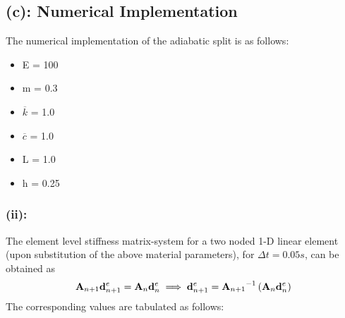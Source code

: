 \subsection*{(c): Numerical Implementation}
The numerical implementation of the adiabatic split is as follows:
\begin{itemize}
\item E = 100
\item m = 0.3 
\item $\overline{k}$ = 1.0
\item $\overline{c}$ = 1.0
\item L = 1.0
\item h = 0.25
\end{itemize}
\subsubsection*{(ii):}
The element level stiffness matrix-system for a two noded 1-D linear element (upon substitution of the above material parameters), for $\Delta t = 0.05s$, can be obtained as 
\begin{align*}
{\bf A}_{n+1}
{\bf d}^e_{n+1}
=
{\bf A}_{n}
{\bf d}^e_{n} \implies {\bf d}^e_{n+1} = {{\bf A}_{n+1}}^{-1}
\left( 
{\bf A}_{n}
{\bf d}^e_{n}
\right)
\end{align*}
The corresponding values are tabulated as follows:
